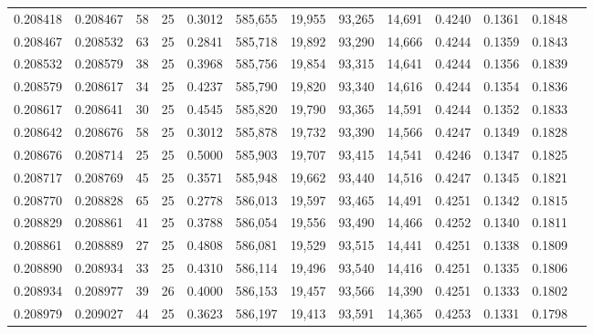 \begin{tabular}{rrrrrrrrrrrrr}
0.208418 & 0.208467 &  58 &  25 &                                     0.3012 & 585,655 &  19,955 &  93,265 &  14,691 & 0.4240 & 0.1361 & 0.1848 \\
0.208467 & 0.208532 &  63 &  25 &                                     0.2841 & 585,718 &  19,892 &  93,290 &  14,666 & 0.4244 & 0.1359 & 0.1843 \\
0.208532 & 0.208579 &  38 &  25 &                                     0.3968 & 585,756 &  19,854 &  93,315 &  14,641 & 0.4244 & 0.1356 & 0.1839 \\
0.208579 & 0.208617 &  34 &  25 &                                     0.4237 & 585,790 &  19,820 &  93,340 &  14,616 & 0.4244 & 0.1354 & 0.1836 \\
0.208617 & 0.208641 &  30 &  25 &                                     0.4545 & 585,820 &  19,790 &  93,365 &  14,591 & 0.4244 & 0.1352 & 0.1833 \\
0.208642 & 0.208676 &  58 &  25 &                                     0.3012 & 585,878 &  19,732 &  93,390 &  14,566 & 0.4247 & 0.1349 & 0.1828 \\
0.208676 & 0.208714 &  25 &  25 &                                     0.5000 & 585,903 &  19,707 &  93,415 &  14,541 & 0.4246 & 0.1347 & 0.1825 \\
0.208717 & 0.208769 &  45 &  25 &                                     0.3571 & 585,948 &  19,662 &  93,440 &  14,516 & 0.4247 & 0.1345 & 0.1821 \\
0.208770 & 0.208828 &  65 &  25 &                                     0.2778 & 586,013 &  19,597 &  93,465 &  14,491 & 0.4251 & 0.1342 & 0.1815 \\
0.208829 & 0.208861 &  41 &  25 &                                     0.3788 & 586,054 &  19,556 &  93,490 &  14,466 & 0.4252 & 0.1340 & 0.1811 \\
0.208861 & 0.208889 &  27 &  25 &                                     0.4808 & 586,081 &  19,529 &  93,515 &  14,441 & 0.4251 & 0.1338 & 0.1809 \\
0.208890 & 0.208934 &  33 &  25 &                                     0.4310 & 586,114 &  19,496 &  93,540 &  14,416 & 0.4251 & 0.1335 & 0.1806 \\
0.208934 & 0.208977 &  39 &  26 &                                     0.4000 & 586,153 &  19,457 &  93,566 &  14,390 & 0.4251 & 0.1333 & 0.1802 \\
0.208979 & 0.209027 &  44 &  25 &                                     0.3623 & 586,197 &  19,413 &  93,591 &  14,365 & 0.4253 & 0.1331 & 0.1798 \\

\end{tabular}
